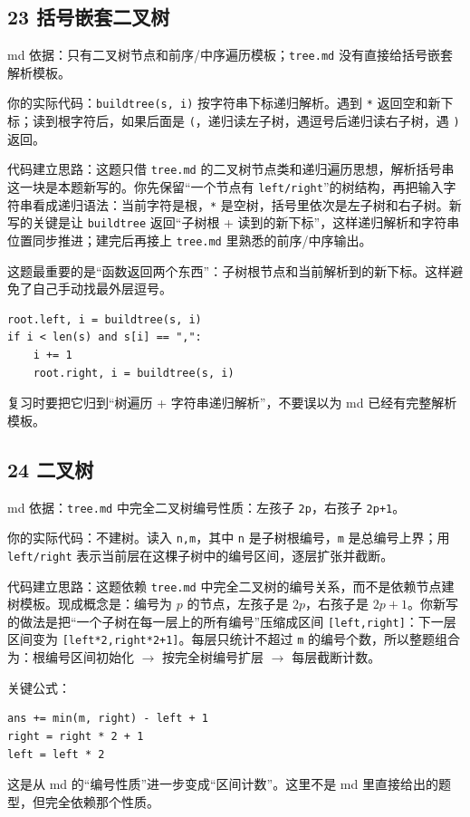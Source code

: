 \documentclass[10pt,a4paper,fontset=none]{ctexart}
\begin{document}
\subsection{23 括号嵌套二叉树}
\begin{sourcebox}
md 依据：只有二叉树节点和前序/中序遍历模板；\texttt{tree.md} 没有直接给括号嵌套解析模板。
\end{sourcebox}
\begin{methodbox}
你的实际代码：\texttt{buildtree(s, i)} 按字符串下标递归解析。遇到 \texttt{*} 返回空和新下标；读到根字符后，如果后面是 \texttt{(}，递归读左子树，遇逗号后递归读右子树，遇 \texttt{)} 返回。

代码建立思路：这题只借 \texttt{tree.md} 的二叉树节点类和递归遍历思想，解析括号串这一块是本题新写的。你先保留“一个节点有 \texttt{left/right}”的树结构，再把输入字符串看成递归语法：当前字符是根，\texttt{*} 是空树，括号里依次是左子树和右子树。新写的关键是让 \texttt{buildtree} 返回“子树根 + 读到的新下标”，这样递归解析和字符串位置同步推进；建完后再接上 \texttt{tree.md} 里熟悉的前序/中序输出。
\end{methodbox}
这题最重要的是“函数返回两个东西”：子树根节点和当前解析到的新下标。这样避免了自己手动找最外层逗号。
\begin{lstlisting}[style=py]
root.left, i = buildtree(s, i)
if i < len(s) and s[i] == ",":
    i += 1
    root.right, i = buildtree(s, i)
\end{lstlisting}
复习时要把它归到“树遍历 + 字符串递归解析”，不要误以为 md 已经有完整解析模板。

\subsection{24 二叉树}
\begin{sourcebox}
md 依据：\texttt{tree.md} 中完全二叉树编号性质：左孩子 \texttt{2p}，右孩子 \texttt{2p+1}。
\end{sourcebox}
\begin{methodbox}
你的实际代码：不建树。读入 \texttt{n,m}，其中 \texttt{n} 是子树根编号，\texttt{m} 是总编号上界；用 \texttt{left/right} 表示当前层在这棵子树中的编号区间，逐层扩张并截断。

代码建立思路：这题依赖 \texttt{tree.md} 中完全二叉树的编号关系，而不是依赖节点建树模板。现成概念是：编号为 $p$ 的节点，左孩子是 $2p$，右孩子是 $2p+1$。你新写的做法是把“一个子树在每一层上的所有编号”压缩成区间 \texttt{[left,right]}：下一层区间变为 \texttt{[left*2,right*2+1]}。每层只统计不超过 \texttt{m} 的编号个数，所以整题组合为：根编号区间初始化 $\rightarrow$ 按完全树编号扩层 $\rightarrow$ 每层截断计数。
\end{methodbox}
关键公式：
\begin{lstlisting}[style=py]
ans += min(m, right) - left + 1
right = right * 2 + 1
left = left * 2
\end{lstlisting}
这是从 md 的“编号性质”进一步变成“区间计数”。这里不是 md 里直接给出的题型，但完全依赖那个性质。
\end{document}
